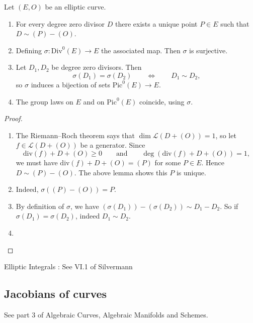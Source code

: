 \begin{proposition}
    Let $(E, O)$ be an elliptic curve.
    \begin{enumerate}[label=(\roman*)]
        \item For every degree zero divisor $D$ there exists a unique point $P \in E$ such that $D \sim{} (P) - (O)$.
        
        \item Defining $\sigma \colon \text{Div}^0(E) \to E$ the associated map. Then $\sigma$ is surjective.
        
        \item Let $D_1, D_2$ be degree zero divisors. Then
        \[ \sigma(D_1) = \sigma(D_2) \qquad \iff \qquad D_1 \sim{} D_2 , \]
        so $\sigma$ induces a bijection of sets $\text{Pic}^0(E) \to E$.
        
        \item The group laws on $E$ and on $\text{Pic}^0(E)$ coincide, using $\sigma$.
    \end{enumerate}
\end{proposition}
\begin{proof}
    \begin{enumerate}[label=(\roman*)]
        \item The Riemann--Roch theorem says that $\dim \mathcal{L}(D + (O)) = 1$, so let $f \in \mathcal{L}(D + (O))$ be a generator. Since
        \[ \text{div}(f) + D + (O) \ge 0 \qquad \text{and} \qquad \deg(\text{div}(f) + D + (O)) = 1, \]
        we must have $\text{div}(f) + D + (O) = (P)$ for some $P \in E$. Hence $D \sim{} (P) - (O)$. The above lemma shows this $P$ is unique.
        
        \item Indeed, $\sigma((P) - (O)) = P$.
        
        \item By definition of $\sigma$, we have $(\sigma(D_1)) - (\sigma(D_2)) \sim{} D_1 - D_2$. So if $\sigma(D_1) = \sigma(D_2)$, indeed $D_1 \sim{} D_2$.
        
        \item {}
    \end{enumerate}
\end{proof}

Elliptic Integrals : See VI.1 of Silvermann

\subsection{Jacobians of curves}

See part 3 of Algebraic Curves, Algebraic Manifolds and Schemes.